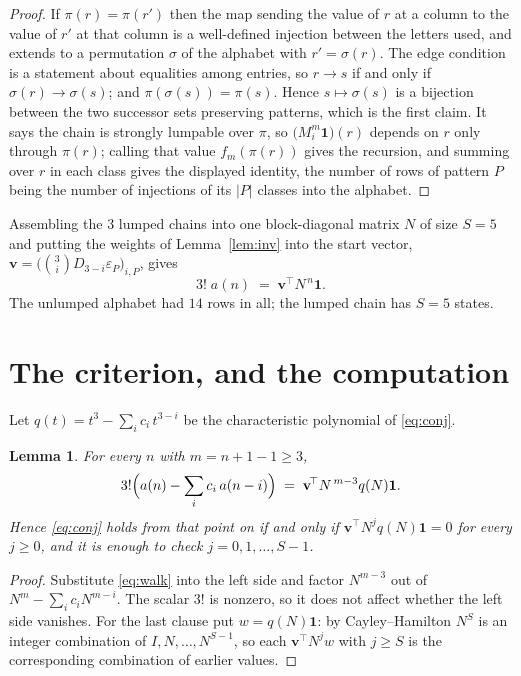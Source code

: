 \documentclass[11pt,a4paper]{article}
\theoremstyle{plain}
\newtheorem{lemma}[theorem]{Lemma}
\theoremstyle{definition}
\begin{document}
\begin{proof}
If $\pi(r)=\pi(r')$ then the map sending the value of $r$ at a column to the value of $r'$
at that column is a well-defined injection between the letters used, and extends to a
permutation $\sigma$ of the alphabet with $r'=\sigma(r)$. The edge condition is a statement
about equalities among entries, so $r\to s$ if and only if $\sigma(r)\to\sigma(s)$; and
$\pi(\sigma(s))=\pi(s)$. Hence $s\mapsto\sigma(s)$ is a bijection between the two successor
sets preserving patterns, which is the first claim. It says the chain is strongly lumpable
over $\pi$, so $\bigl(M_i^{m}\mathbf{1}\bigr)(r)$ depends on $r$ only through $\pi(r)$;
calling that value $f_m(\pi(r))$ gives the recursion, and summing over $r$ in each class
gives the displayed identity, the number of rows of pattern $P$ being the number of
injections of its $|P|$ classes into the alphabet.
\end{proof}

Assembling the $3$ lumped chains into one block-diagonal matrix $N$ of size $S=5$ and
putting the weights of Lemma~\ref{lem:inv} into the start vector,
$\mathbf{v}=\bigl(\binom{3}{i}D_{3-i}\varepsilon_P\bigr)_{i,P}$, gives
\begin{equation}\label{eq:walk}
3!\;a(n)\;=\;\mathbf{v}^{\!\top}N^{\,n}\mathbf{1} .
\end{equation}
The unlumped alphabet had $14$ rows in all; the lumped chain has $S=5$ states.

\section{The criterion, and the computation}

Let $q(t)=t^{3}-\sum_i c_i\,t^{3-i}$ be the characteristic polynomial of
\eqref{eq:conj}.

\begin{lemma}\label{lem:crit}
For every $n$ with $m=n+1-1\ge3$,
\[
3!\Bigl(a(n)-\sum_i c_i\,a(n-i)\Bigr)\;=\;\mathbf{v}^{\!\top}N^{\,m-3}q(N)\mathbf{1} .
\]
Hence \eqref{eq:conj} holds from that point on if and only if
$\mathbf{v}^{\!\top}N^{j}q(N)\mathbf{1}=0$ for every $j\ge0$, and it is enough to check
$j=0,1,\dots,S-1$.
\end{lemma}

\begin{proof}
Substitute \eqref{eq:walk} into the left side and factor $N^{m-3}$ out of
$N^{m}-\sum_i c_iN^{m-i}$. The scalar $3!$ is nonzero, so it does not affect whether
the left side vanishes. For the last clause put $w=q(N)\mathbf{1}$: by Cayley--Hamilton
$N^{S}$ is an integer combination of $I,N,\dots,N^{S-1}$, so each
$\mathbf{v}^{\!\top}N^{j}w$ with $j\ge S$ is the corresponding combination of earlier
values.
\end{proof}
\end{document}

